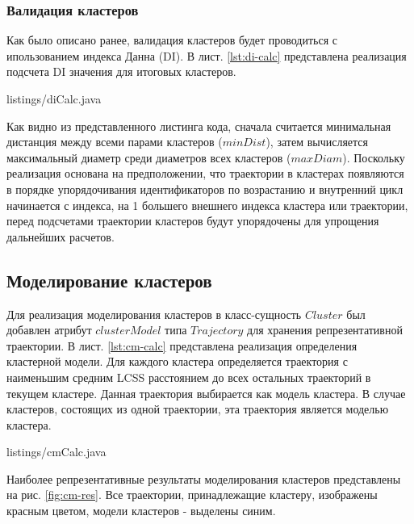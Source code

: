 \subsubsection{Валидация кластеров}

Как было описано ранее, валидация кластеров будет проводиться с ипользованием индекса Данна (DI). В лист. \ref{lst:di-calc} представлена реализация подсчета DI значения для итоговых кластеров.

 {listings/diCalc.java}

Как видно из представленного листинга кода, сначала считается минимальная дистанция между всеми парами кластеров ($minDist$), затем вычисляется максимальный диаметр среди диаметров всех кластеров ($maxDiam$). Поскольку реализация основана на предположении, что траектории в кластерах появляются в порядке упорядочивания идентификаторов по возрастанию и внутренний цикл начинается с индекса, на 1 большего внешнего индекса кластера или траектории, перед подсчетами траектории кластеров будут упорядочены для упрощения дальнейших расчетов.

\subsection{Моделирование кластеров}

Для реализация моделирования кластеров в класс-сущность $Cluster$ был добавлен атрибут $clusterModel$ типа $Trajectory$ для хранения репрезентативной траектории. В лист. \ref{lst:cm-calc} представлена реализация определения кластерной модели. Для каждого кластера определяется траектория с наименьшим средним LCSS расстоянием до всех остальных траекторий в текущем кластере. Данная траектория выбирается как модель кластера. В случае кластеров, состоящих из одной траектории, эта траектория является моделью кластера.

 {listings/cmCalc.java}

Наиболее репрезентативные результаты моделирования кластеров представлены на рис. \ref{fig:cm-res}. Все траектории, принадлежащие кластеру, изображены красным цветом, модели кластеров - выделены синим.

